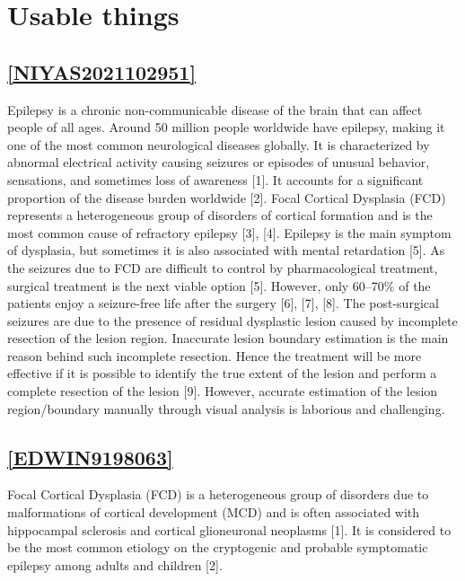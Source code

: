 \chapter{Usable things}

\section{\href{https://www.sciencedirect.com/science/article/pii/S1746809421005486}{[NIYAS2021102951]}}

Epilepsy is a chronic non-communicable disease of the brain that can affect people of all ages. Around 50 million people worldwide have epilepsy, making it one of the most common neurological diseases globally. It is characterized by abnormal electrical activity causing seizures or episodes of unusual behavior, sensations, and sometimes loss of awareness [1]. It accounts for a significant proportion of the disease burden worldwide [2]. Focal Cortical Dysplasia (FCD) represents a heterogeneous group of disorders of cortical formation and is the most common cause of refractory epilepsy [3], [4]. Epilepsy is the main symptom of dysplasia, but sometimes it is also associated with mental retardation [5]. As the seizures due to FCD are difficult to control by pharmacological treatment, surgical treatment is the next viable option [5]. However, only 60–70\% of the patients enjoy a seizure-free life after the surgery [6], [7], [8]. The post-surgical seizures are due to the presence of residual dysplastic lesion caused by incomplete resection of the lesion region. Inaccurate lesion boundary estimation is the main reason behind such incomplete resection. Hence the treatment will be more effective if it is possible to identify the true extent of the lesion and perform a complete resection of the lesion [9]. However, accurate estimation of the lesion region/boundary manually through visual analysis is laborious and challenging.

\section{\href{https://ieeexplore.ieee.org/document/9198063}{[EDWIN9198063]}}

Focal Cortical Dysplasia (FCD) is a heterogeneous group of disorders due to malformations of cortical development (MCD) and is often associated with hippocampal sclerosis and cortical glioneuronal neoplasms [1]. It is considered to be the most common etiology on the cryptogenic and probable symptomatic epilepsy among adults and children [2].

